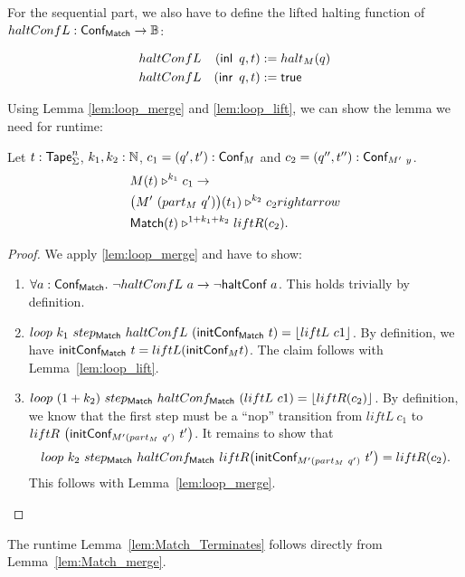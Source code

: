 For the sequential part, we also have to define the lifted halting function of \\$haltConfL : \textsf{Conf}_{\textsf{Match}} \rightarrow \mathbb{B}$:
\begin{definition}
  \begin{alignat*}{2}
    & haltConfL & (\operatorname{\textsf{inl}}~q, t) &:= halt_M(q) \\
    & haltConfL & (\operatorname{\textsf{inr}}~q, t) &:= \textsf{true}
  \end{alignat*}
\end{definition}

Using Lemma \ref{lem:loop_merge} and \ref{lem:loop_lift}, we can show the lemma we need for runtime:
\begin{lemma}
  \label{lem:Match_merge}
  Let $t : \textsf{Tape}_\Sigma^n$, $k_1, k_2:\mathbb{N}$, $c_1=(q', t') : \textsf{Conf}_M$ and $c_2=(q'', t'') : \textsf{Conf}_{M'~y}$.
  \begin{alignat*}{1}
    & M(t) \mathrel{\triangleright}^{k_1} c_1 \rightarrow\\
    & \bigl( M'~(part_M~q') \bigr) (t_1) \mathrel{\triangleright}^{k_2} c_2 rightarrow\\
    & \textsf{Match}(t) \mathrel{\triangleright}^{1+k_1+k_2} liftR(c_2).
  \end{alignat*}
\end{lemma}
\begin{proof}
  We apply \ref{lem:loop_merge} and have to show:
  \begin{enumerate}
  \item $\forall a:\textsf{Conf}_{\textsf{Match}}.~ \lnot haltConfL~a \rightarrow \lnot \textsf{haltConf}~a$.  This holds trivially by definition.
  \item $loop~k_1~step_{\textsf{Match}}~haltConfL~(\textsf{initConf}_{\textsf{Match}}~t) =
    \left\lfloor {liftL~c1} \right\rfloor$.  By definition, we have $\textsf{initConf}_{\textsf{Match}}~t=liftL(\textsf{initConf}_M t)$.  The claim follows with Lemma~\ref{lem:loop_lift}.
  \item $loop~(1+k_2)~step_{\textsf{Match}}~haltConf_{\textsf{Match}}~(liftL~c1) =
    \left\lfloor {liftR(c_2)} \right\rfloor$.  By definition, we know that the first step must be a ``nop'' transition from
    $liftL~c_1$ to $liftR~\bigl(\textsf{initConf}_{M'(part_M~q')}~t' \bigr)$.
    It remains to show that
    $$ loop~k_2~step_{\textsf{Match}}~haltConf_{\textsf{Match}}~liftR \bigl(\textsf{initConf}_{M'(part_M~q')}~t' \bigr) = liftR(c_2).$$
    This follows with Lemma~\ref{lem:loop_merge}.
  \end{enumerate}
\end{proof}
The runtime Lemma~\ref{lem:Match_Terminates} follows directly from Lemma~\ref{lem:Match_merge}.

